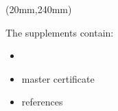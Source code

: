 \begin{textblock*}{290mm}(20mm,240mm)

The supplements contain:
\begin{itemize}
    \item 
    \item master certificate
    \item references
\end{itemize}


\end{textblock*}

\newpage 